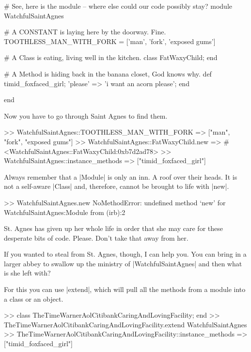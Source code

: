 \documentclass[12pt,twoside]{report}
\begin{document}
\begin{rubycode}

 # See, here is the module -- where else could our code possibly stay?
 module WatchfulSaintAgnes

   # A CONSTANT is laying here by the doorway.  Fine.
   TOOTHLESS_MAN_WITH_FORK = ['man', 'fork', 'exposed gums']

   # A Class is eating, living well in the kitchen.
   class FatWaxyChild; end

   # A Method is hiding back in the banana closet, God knows why.
   def timid_foxfaced_girl; {'please' => 'i want an acorn please'}; end

 end

\end{rubycode}


Now you have to go through Saint Agnes to find them.


\begin{consolecode}

 >> WatchfulSaintAgnes::TOOTHLESS_MAN_WITH_FORK
 => ["man", "fork", "exposed gums"]
 >> WatchfulSaintAgnes::FatWaxyChild.new
 => #<WatchfulSaintAgnes::FatWaxyChild:0xb7d2ad78>
 >> WatchfulSaintAgnes::instance_methods
 => ["timid_foxfaced_girl"]

\end{consolecode}


Always remember that a \rubyinline|Module| is only an
inn.  A roof over their heads.  It is not a self-aware
\rubyinline|Class| and, therefore, cannot be brought
to life with \rubyinline|new|.


\begin{consolecode}

 >> WatchfulSaintAgnes.new
 NoMethodError: undefined method `new' for WatchfulSaintAgnes:Module
         from (irb):2

\end{consolecode}


St. Agnes has given up her whole life in order that she may care for
these desperate bits of code. Please.  Don't take that away from her.

If you wanted to steal from St. Agnes, though, I can help you. You can
bring in a larger abbey to swallow up the ministry of
\rubyinline|WatchfulSaintAgnes| and then what is she
left with?

For this you can use \rubyinline|extend|, which will
pull all the methods from a module into a class or an object.


\begin{consolecode}

 >> class TheTimeWarnerAolCitibankCaringAndLovingFacility; end
 >> TheTimeWarnerAolCitibankCaringAndLovingFacility.extend WatchfulSaintAgnes
 >> TheTimeWarnerAolCitibankCaringAndLovingFacility::instance_methods
 => ["timid_foxfaced_girl"]

\end{consolecode}
\end{document}
